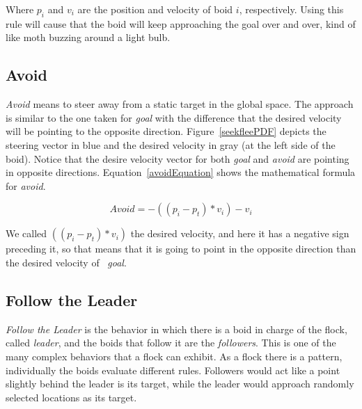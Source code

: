 Where $p_i$ and $v_i$ are the position and velocity of boid $i$, respectively. Using this rule will cause that the boid will keep approaching the goal over and over, kind of like moth buzzing around a light bulb.

\subsection{Avoid}
\textit{Avoid} means to steer away from a static target in the global space. The approach is similar to the one taken for \textit{goal} with the difference that the desired velocity will be pointing to the opposite direction. Figure~\ref{seekfleePDF} depicts the steering vector in blue and the desired velocity in gray (at the left side of the boid). Notice that the desire velocity vector for both \textit{goal} and \textit{avoid} are pointing in opposite directions. Equation~\ref{avoidEquation} shows the mathematical formula for \textit{avoid}.

\begin{equation}
\label{avoidEquation}
Avoid = -((p_i - p_t) * v_i) - v_i
\end{equation}

We called $((p_i - p_t) * v_i)$ the desired velocity, and here it has a negative sign preceding it, so that means that it is going to point in the opposite direction than the desired velocity of ~\textit{goal}.

\subsection{Follow the Leader}
\textit{Follow the Leader} is the behavior in which there is a boid in charge of the flock, called \textit{leader}, and the boids that follow it are the \textit{followers}. This is one of the many complex behaviors that a flock can exhibit. As a flock there is a pattern, individually the boids evaluate different rules. Followers would act like a point slightly behind the leader is its target, while the leader would approach randomly selected locations as its target.

